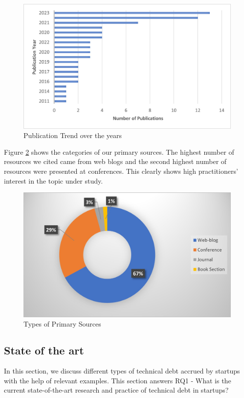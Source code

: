 \begin{figure}
  \includegraphics[width=\textwidth]{PublicationTrend.jpg}
  \caption{Publication Trend over the years}
 \label{fig:Trend}
\end{figure}

Figure \ref{fig:Sources} shows the categories of our primary sources. The highest number of resources we cited came from web blogs and the second highest number of resources were presented at conferences. This clearly shows high practitioners’ interest in the topic under study. 

\begin{figure}
  \includegraphics[width=\textwidth]{TypeSources.jpg}
  \caption{Types of Primary Sources}
 \label{fig:Sources}
\end{figure}

\subsection{State of the art}
In this section, we discuss different types of technical debt accrued by startups with the help of relevant examples. This section answers RQ1 - What is the current state-of-the-art research and practice of technical debt in startups?

